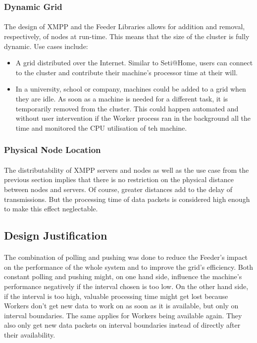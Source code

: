 \subsubsection{Dynamic Grid}
\paragraph{}
The design of XMPP and the Feeder Libraries allows for addition and removal, respectively, of nodes at run-time. This means that the size of the cluster is fully dynamic. Use cases include:
\begin{itemize}
\item A grid distributed over the Internet. Similar to Seti@Home, users can connect to the cluster and contribute their machine's processor time at their will.
\item In a university, school or company, machines could be added to a grid when they are idle. As soon as a machine is needed for a different task, it is temporarily removed from the cluster. This could happen automated and without user intervention if the Worker process ran in the background all the time and monitored the CPU utilisation of teh machine.
\end{itemize}

\subsubsection{Physical Node Location}
\paragraph{}
The distributability of XMPP servers and nodes as well as the use case from the previous section implies that there is no restriction on the physical distance between nodes and servers. Of course, greater distances add to the delay of transmissions. But the processing time of data packets is considered high enough to make this effect neglectable.

\subsection{Design Justification}
\paragraph{}
The combination of polling and pushing was done to reduce the Feeder's impact on the performance of the whole system and to improve the grid's efficiency. Both constant polling and pushing might, on one hand side, influence the machine's performance negatively if the interval chosen is too low. On the other hand side, if the interval is too high, valuable processing time might get lost because Workers don't get new data to work on as soon as it is available, but only on interval boundaries. The same applies for Workers being available again. They also only get new data packets on interval boundaries instead of directly after their availability.

